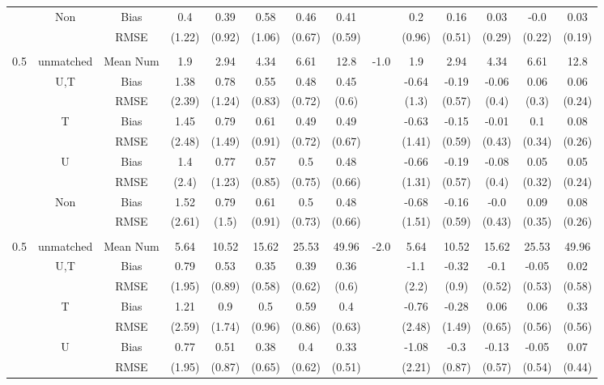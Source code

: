 \begin{tabular}{@{\extracolsep{5pt}}lc|cccccc|lccccc}
 & Non & Bias & 0.4 & 0.39 & 0.58 & 0.46 & 0.41 &  & 0.2 & 0.16 & 0.03 & -0.0 & 0.03 \\
 &  & RMSE & (1.22) & (0.92) & (1.06) & (0.67) & (0.59) &  & (0.96) & (0.51) & (0.29) & (0.22) & (0.19) \\
 &  &  &  &  &  &  &  &  &  &  &  &  &  \\
0.5 & unmatched & Mean Num & 1.9 & 2.94 & 4.34 & 6.61 & 12.8 & -1.0 & 1.9 & 2.94 & 4.34 & 6.61 & 12.8 \\
 & U,T & Bias & 1.38 & 0.78 & 0.55 & 0.48 & 0.45 &  & -0.64 & -0.19 & -0.06 & 0.06 & 0.06 \\
 &  & RMSE & (2.39) & (1.24) & (0.83) & (0.72) & (0.6) &  & (1.3) & (0.57) & (0.4) & (0.3) & (0.24) \\
 & T & Bias & 1.45 & 0.79 & 0.61 & 0.49 & 0.49 &  & -0.63 & -0.15 & -0.01 & 0.1 & 0.08 \\
 &  & RMSE & (2.48) & (1.49) & (0.91) & (0.72) & (0.67) &  & (1.41) & (0.59) & (0.43) & (0.34) & (0.26) \\
 & U & Bias & 1.4 & 0.77 & 0.57 & 0.5 & 0.48 &  & -0.66 & -0.19 & -0.08 & 0.05 & 0.05 \\
 &  & RMSE & (2.4) & (1.23) & (0.85) & (0.75) & (0.66) &  & (1.31) & (0.57) & (0.4) & (0.32) & (0.24) \\
 & Non & Bias & 1.52 & 0.79 & 0.61 & 0.5 & 0.48 &  & -0.68 & -0.16 & -0.0 & 0.09 & 0.08 \\
 &  & RMSE & (2.61) & (1.5) & (0.91) & (0.73) & (0.66) &  & (1.51) & (0.59) & (0.43) & (0.35) & (0.26) \\
 &  &  &  &  &  &  &  &  &  &  &  &  &  \\
0.5 & unmatched & Mean Num & 5.64 & 10.52 & 15.62 & 25.53 & 49.96 & -2.0 & 5.64 & 10.52 & 15.62 & 25.53 & 49.96 \\
 & U,T & Bias & 0.79 & 0.53 & 0.35 & 0.39 & 0.36 &  & -1.1 & -0.32 & -0.1 & -0.05 & 0.02 \\
 &  & RMSE & (1.95) & (0.89) & (0.58) & (0.62) & (0.6) &  & (2.2) & (0.9) & (0.52) & (0.53) & (0.58) \\
 & T & Bias & 1.21 & 0.9 & 0.5 & 0.59 & 0.4 &  & -0.76 & -0.28 & 0.06 & 0.06 & 0.33 \\
 &  & RMSE & (2.59) & (1.74) & (0.96) & (0.86) & (0.63) &  & (2.48) & (1.49) & (0.65) & (0.56) & (0.56) \\
 & U & Bias & 0.77 & 0.51 & 0.38 & 0.4 & 0.33 &  & -1.08 & -0.3 & -0.13 & -0.05 & 0.07 \\
 &  & RMSE & (1.95) & (0.87) & (0.65) & (0.62) & (0.51) &  & (2.21) & (0.87) & (0.57) & (0.54) & (0.44) \\

\end{tabular}
